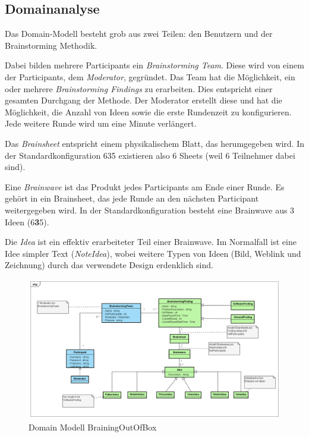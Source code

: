 \subsection{Domainanalyse}

Das Domain-Modell besteht grob aus zwei Teilen: den Benutzern und der Brainstorming Methodik. 

Dabei bilden mehrere Participants ein \textit{Brainstorming Team}. Diese wird von einem der Participants, dem \textit{Moderator}, gegründet.  Das Team hat die Möglichkeit, ein oder mehrere \textit{Brainstorming Findings} zu erarbeiten. Dies entspricht einer gesamten Durchgang der Methode. Der Moderator erstellt diese und hat die Möglichkeit, die Anzahl von Ideen sowie die erste Rundenzeit zu konfigurieren. Jede weitere Runde wird um eine Minute verlängert.

Das \textit{Brainsheet} entspricht einem physikalischem Blatt, das herumgegeben wird. In der Standardkonfiguration 635 existieren also 6 Sheets (weil 6 Teilnehmer dabei sind).

Eine \textit{Brainwave} ist das Produkt jedes Participants am Ende einer Runde. Es gehört in ein Brainsheet, das jede Runde an den nächsten Participant weitergegeben wird. In der Standardkonfiguration besteht eine Brainwave aus 3 Ideen (6\textbf{3}5).

Die \textit{Idea} ist ein effektiv erarbeiteter Teil einer Brainwave. Im Normalfall ist eine Idee simpler Text (\textit{NoteIdea}), wobei weitere Typen von Ideen (Bild, Weblink und Zeichnung) durch das verwendete Design erdenklich sind. 
\begin{figure}[h]
	\centering
	\includegraphics[width=1\linewidth]{img/domain-analyse/DomainModell-Methode635}
	\caption{Domain Modell BrainingOutOfBox}
	\label{fig:domainmodell-methode635}
\end{figure}
